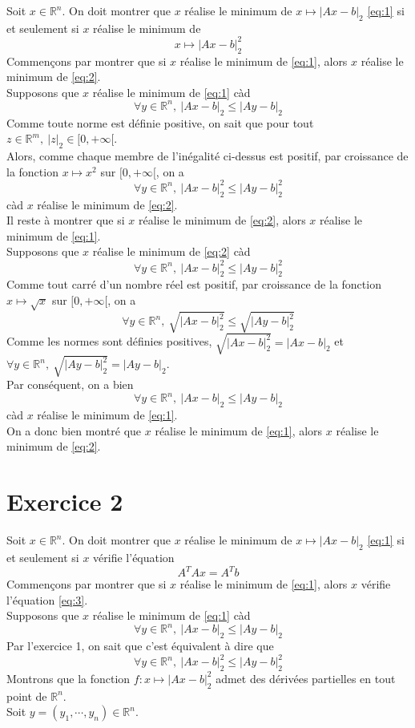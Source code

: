 \documentclass[a4paper, 10pt]{article}
\newcommand{\IR}{\mathbb{R}}
\begin{document}
Soit \( x \in \IR^n \). On doit montrer que \( x \) réalise le minimum de \( x \mapsto |Ax - b|_2 \) \eqref{eq:1} si et seulement si \( x \) réalise le minimum de
\begin{equation}
    \label{eq:2}
    x \mapsto |Ax - b|_2^2
\end{equation}
Commençons par montrer que si \( x \) réalise le minimum de \eqref{eq:1}, alors \( x \) réalise le minimum de \eqref{eq:2}. \\
Supposons que \( x \) réalise le minimum de \eqref{eq:1} càd
$$
\forall y \in \IR^n,~ |Ax - b|_2 \leq |Ay - b|_2
$$
Comme toute norme est définie positive, on sait que pour tout \( z \in \IR^m,~ |z|_2 \in [0, +\infty[ \). \\
Alors, comme chaque membre de l'inégalité ci-dessus est positif, par croissance de la fonction \( x \mapsto x^2 \) sur \( [0, +\infty[ \), on a
$$
\forall y \in \IR^n,~ |Ax - b|_2^2 \leq |Ay - b|_2^2
$$
càd \( x \) réalise le minimum de \eqref{eq:2}. \\
Il reste à montrer que si \( x \) réalise le minimum de \eqref{eq:2}, alors \( x \) réalise le minimum de \eqref{eq:1}. \\
Supposons que \( x \) réalise le minimum de \eqref{eq:2} càd
$$
\forall y \in \IR^n,~ |Ax - b|_2^2 \leq |Ay - b|_2^2
$$
Comme tout carré d'un nombre réel est positif, par croissance de la fonction \( x \mapsto \sqrt{x} \) sur \( [0, +\infty[ \), on a
$$
\forall y \in \IR^n,~ \sqrt{|Ax - b|_2^2} \leq \sqrt{|Ay - b|_2^2}
$$
Comme les normes sont définies positives, \( \sqrt{|Ax - b|_2^2} = |Ax - b|_2 \) et \( \forall y \in \IR^n,~ \sqrt{|Ay - b|_2^2} = |Ay - b|_2 \). \\
Par conséquent, on a bien
$$
\forall y \in \IR^n,~ |Ax - b|_2 \leq |Ay - b|_2
$$
càd \( x \) réalise le minimum de \eqref{eq:1}. \\
On a donc bien montré que \( x \) réalise le minimum de \eqref{eq:1}, alors \( x \) réalise le minimum de \eqref{eq:2}.

\newpage

\section{Exercice 2}

Soit \( x \in \IR^n \). On doit montrer que \( x \) réalise le minimum de \( x \mapsto |Ax - b|_2 \) \eqref{eq:1} si et seulement si \( x \) vérifie l'équation
\begin{equation}
    \label{eq:3}
    A^T A x = A^T b
\end{equation}
Commençons par montrer que si \( x \) réalise le minimum de \eqref{eq:1}, alors \( x \) vérifie l'équation \eqref{eq:3}. \\
Supposons que \( x \) réalise le minimum de \eqref{eq:1} càd
$$
\forall y \in \IR^n,~ |Ax - b|_2 \leq |Ay - b|_2
$$
Par l'exercice 1, on sait que c'est équivalent à dire que
$$
\forall y \in \IR^n,~ |Ax - b|_2^2 \leq |Ay - b|_2^2
$$
Montrons que la fonction \( f : x \mapsto |Ax - b|_2^2 \) admet des dérivées partielles en tout point de \( \IR^n \). \\
Soit \( y = (y_1, \cdots, y_n) \in \IR^n \).
\end{document}
